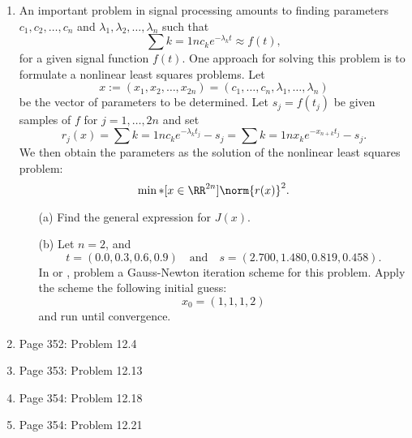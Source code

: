 \documentclass[11pt, oneside]{article}
\begin{document}
\begin{enumerate}
  \item %
    An important problem in signal processing amounts to finding parameters
    $c_1, c_2, \ldots, c_n$ and $\lambda_1, \lambda_2, \ldots, \lambda_n$ such
    that
    \[
      \sum{k=1}{n}{c_k e^{-\lambda_k t}} \approx f(t),
    \]
    for a given signal function $f(t)$.
    One approach for solving this problem is to formulate a nonlinear least
    squares problems.
    Let
    \[
      x := (x_1, x_2, \ldots, x_{2n}) = (c_1, \ldots, c_n, \lambda_1, \ldots, \lambda_n)
    \]
    be the vector of parameters to be determined.
    Let $s_j = f(t_j)$ be given samples of $f$ for $j = 1,\ldots,2n$ and set
    \[
      r_j(x) = \sum{k=1}{n}{c_k e^{-\lambda_k t_j}} - s_j = \sum{k=1}{n}{x_k e^{-x_{n+k}t_j}} - s_j.
    \]
    We then obtain the parameters as the solution of the nonlinear least squares
    problem:
    \[
      \min*[x \in \RR^{2n}]{\norm{r(x)}^2}.
    \]
    \begin{enumerate}
      \item[(a)]
        Find the general expression for $J(x)$.

      \item[(b)]
        Let $n = 2$, and
        \[
          t = (0.0, 0.3, 0.6, 0.9) \quad \text{and} \quad s = (2.700, 1.480, 0.819, 0.458).
        \]
        In \MATLAB or \PYTHON, problem a Gauss-Newton iteration scheme for this
        problem.
        Apply the scheme the following initial guess:
        \[
          x_0 = (1, 1, 1, 2)
        \]
        and run until convergence.
    \end{enumerate}

  \item %
    Page 352: Problem 12.4 \\

  \item %
    Page 353: Problem 12.13 \\

  \item %
    Page 354: Problem 12.18 \\

  \item %
    Page 354: Problem 12.21 \\
\end{enumerate}
\end{document}
